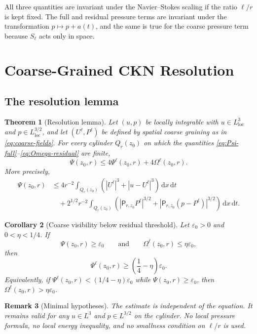 \documentclass[11pt]{article}
\numberwithin{equation}{section}
\newtheorem{theorem}{Theorem}[section]
\newtheorem{corollary}[theorem]{Corollary}
\newtheorem{remark}[theorem]{Remark}
\newcommand{\eps}{\varepsilon}
\newcommand{\loc}{\mathrm{loc}}
\newcommand{\dxdt}{\,\mathrm dx\,\mathrm dt}
\newcommand{\Pf}{\mathsf P}
\begin{document}
All three quantities are invariant under the Navier--Stokes scaling if the ratio $\ell/r$ is kept fixed.  The full and residual pressure terms are invariant under the transformation $p\mapsto p+a(t)$, and the same is true for the coarse pressure term because $S_\ell$ acts only in space.
\section{Coarse-Grained CKN Resolution}\label{sec:resolution-main}

\subsection{The resolution lemma}

\begin{theorem}[Resolution lemma]\label{thm:resolution}
Let $(u,p)$ be locally integrable with $u\in L^3_{\loc}$ and $p\in L^{3/2}_{\loc}$, and let $(U^\ell,P^\ell)$ be defined by spatial coarse graining as in \eqref{eq:coarse-fields}.  For every cylinder $Q_r(z_0)$ on which the quantities \eqref{eq:Psi-full}--\eqref{eq:Omega-residual} are finite,
\begin{equation}\label{eq:resolution-estimate}
\Psi(z_0,r)\le 4\Psi^\ell(z_0,r)+4\Omega^\ell(z_0,r).
\end{equation}
More precisely,
\begin{align}\label{eq:sharp-resolution-estimate}
\Psi(z_0,r)
&\le
4r^{-2}\int_{Q_r(z_0)}\left(|U^\ell|^3+|u-U^\ell|^3\right)\dxdt
\nonumber\\
&\quad+
2^{1/2}r^{-2}\int_{Q_r(z_0)}\left(|\Pf_{r,z_0}P^\ell|^{3/2}+|\Pf_{r,z_0}(p-P^\ell)|^{3/2}\right)\dxdt.
\end{align}
\end{theorem}

\begin{corollary}[Coarse visibility below residual threshold]\label{cor:coarse-visibility}
Let $\eps_0>0$ and $0<\eta<1/4$.  If
\[
\Psi(z_0,r)\ge \eps_0
\qquad\text{and}\qquad
\Omega^\ell(z_0,r)\le \eta\eps_0,
\]
then
\begin{equation}\label{eq:coarse-lower-bound}
\Psi^\ell(z_0,r)
\ge
\left(\frac14-\eta\right)\eps_0.
\end{equation}
Equivalently, if $\Psi^\ell(z_0,r)<(1/4-\eta)\eps_0$ while $\Psi(z_0,r)\ge\eps_0$, then $\Omega^\ell(z_0,r)>\eta\eps_0$.
\end{corollary}

\begin{remark}[Minimal hypotheses]
The estimate is independent of the equation.  It remains valid for any $u\in L^3$ and $p\in L^{3/2}$ on the cylinder.  No local pressure formula, no local energy inequality, and no smallness condition on $\ell/r$ is used.
\end{remark}
\end{document}
